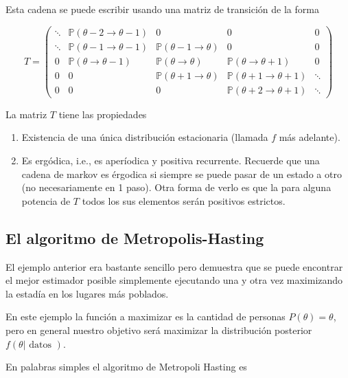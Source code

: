 \documentclass[
  12pt,
]{book}
\providecommand{\tightlist}{%
  \setlength{\itemsep}{0pt}\setlength{\parskip}{0pt}}
\theoremstyle{definition}
\theoremstyle{definition}
\theoremstyle{definition}
\theoremstyle{remark}
\begin{document}
Esta cadena se puede escribir usando una matriz de transición de la forma

\begin{equation*}
T= \left(\begin{array}{ccccc}
\ddots & \mathbb{P}(\theta-2 \rightarrow \theta-1) & 0 & 0 & 0 \\
\ddots & \mathbb{P}(\theta-1 \rightarrow \theta-1) & \mathbb{P}(\theta-1 \rightarrow \theta) & 0 & 0 \\
0 & \mathbb{P}(\theta \rightarrow \theta-1) & \mathbb{P}(\theta \rightarrow \theta) & \mathbb{P}(\theta \rightarrow \theta+1) & 0 \\
0 & 0 & \mathbb{P}(\theta+1 \rightarrow \theta) & \mathbb{P}(\theta+1 \rightarrow \theta+1) & \ddots \\
0 & 0 & 0 & \mathbb{P}(\theta+2 \rightarrow \theta+1) & \ddots
\end{array}\right)
\end{equation*}

La matriz \(T\) tiene las propiedades

\begin{enumerate}
\def\labelenumi{\arabic{enumi}.}
\tightlist
\item
  Existencia de una única distribución estacionaria (llamada \(f\) más adelante).
\item
  Es ergódica, i.e., es aperíodica y positiva recurrente. Recuerde que una cadena de markov es érgodica si siempre se puede pasar de un estado a otro (no necesariamente en 1 paso). Otra forma de verlo es que la para alguna potencia de \(T\) todos los sus elementos serán positivos estrictos.
\end{enumerate}

\hypertarget{el-algoritmo-de-metropolis-hasting}{%
\subsection{El algoritmo de Metropolis-Hasting}\label{el-algoritmo-de-metropolis-hasting}}

El ejemplo anterior era bastante sencillo pero demuestra que se puede
encontrar el mejor estimador posible simplemente ejecutando una y otra
vez maximizando la estadía en los lugares más poblados.

En este ejemplo la función a maximizar es la cantidad de personas
\(P(\theta)=\theta\), pero en general nuestro objetivo será maximizar
la distribución posterior \(f(\theta| \text{ datos })\).

En palabras simples el algoritmo de Metropoli Hasting es
\end{document}
